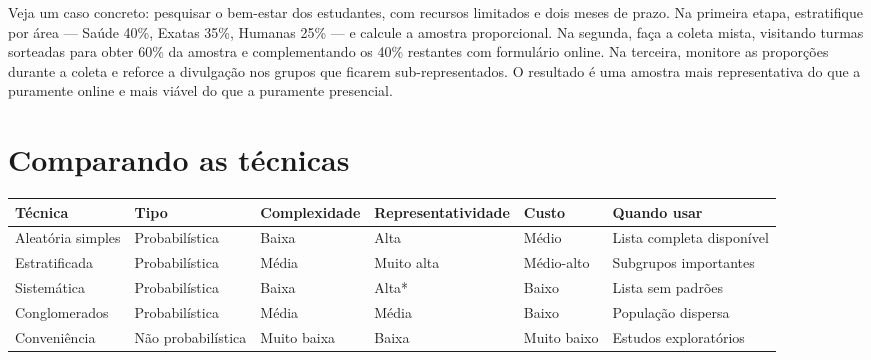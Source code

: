 \documentclass[
]{book}
\newcounter{none} %
\begin{document}
Veja um caso concreto: pesquisar o bem-estar dos estudantes, com recursos limitados e dois meses de prazo. Na primeira etapa, estratifique por área --- Saúde 40\%, Exatas 35\%, Humanas 25\% --- e calcule a amostra proporcional. Na segunda, faça a coleta mista, visitando turmas sorteadas para obter 60\% da amostra e complementando os 40\% restantes com formulário online. Na terceira, monitore as proporções durante a coleta e reforce a divulgação nos grupos que ficarem sub-representados. O resultado é uma amostra mais representativa do que a puramente online e mais viável do que a puramente presencial.

\section{Comparando as técnicas}\label{comparando-as-tuxe9cnicas}

{\def\LTcaptype{none} %
\begin{longtable}[]{@{}
  >{\raggedright\arraybackslash}p{}
  >{\raggedright\arraybackslash}p{}
  >{\raggedright\arraybackslash}p{}
  >{\raggedright\arraybackslash}p{}
  >{\raggedright\arraybackslash}p{}
  >{\raggedright\arraybackslash}p{}@{}}
\toprule\noalign{}
\begin{minipage}[b]{\linewidth}\raggedright
Técnica
\end{minipage} & \begin{minipage}[b]{\linewidth}\raggedright
Tipo
\end{minipage} & \begin{minipage}[b]{\linewidth}\raggedright
Complexidade
\end{minipage} & \begin{minipage}[b]{\linewidth}\raggedright
Representatividade
\end{minipage} & \begin{minipage}[b]{\linewidth}\raggedright
Custo
\end{minipage} & \begin{minipage}[b]{\linewidth}\raggedright
Quando usar
\end{minipage} \\
\midrule\noalign{}
\endhead
\bottomrule\noalign{}
\endlastfoot
Aleatória simples & Probabilística & Baixa & Alta & Médio & Lista completa disponível \\
Estratificada & Probabilística & Média & Muito alta & Médio-alto & Subgrupos importantes \\
Sistemática & Probabilística & Baixa & Alta* & Baixo & Lista sem padrões \\
Conglomerados & Probabilística & Média & Média & Baixo & População dispersa \\
Conveniência & Não probabilística & Muito baixa & Baixa & Muito baixo & Estudos exploratórios \\
\end{longtable}
}
\end{document}

